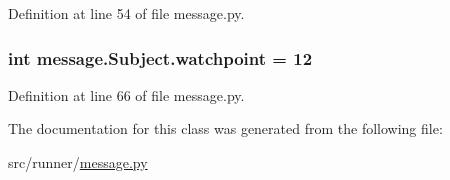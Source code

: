 Definition at line 54 of file message.\+py.

\hypertarget{classmessage_1_1Subject_a7f5bac729d1eeb47d2c9722783efa32b}{}
\subsubsection[{watchpoint}]{\setlength{\rightskip}{0pt plus 5cm}int message.\+Subject.\+watchpoint = 12\hspace{0.3cm}{\ttfamily [static]}}\label{classmessage_1_1Subject_a7f5bac729d1eeb47d2c9722783efa32b}


Definition at line 66 of file message.\+py.



The documentation for this class was generated from the following file\+:\begin{DoxyCompactItemize}
\item 
src/runner/\hyperlink{message_8py}{message.\+py}\end{DoxyCompactItemize}
